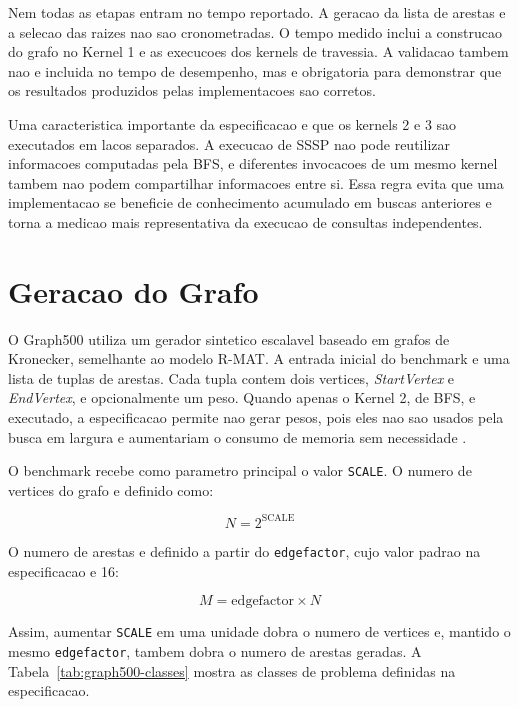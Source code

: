 Nem todas as etapas entram no tempo reportado. A geracao da lista de arestas e a
selecao das raizes nao sao cronometradas. O tempo medido inclui a construcao do
grafo no Kernel 1 e as execucoes dos kernels de travessia. A validacao tambem nao
e incluida no tempo de desempenho, mas e obrigatoria para demonstrar que os
resultados produzidos pelas implementacoes sao corretos.

Uma caracteristica importante da especificacao e que os kernels 2 e 3 sao
executados em lacos separados. A execucao de SSSP nao pode reutilizar informacoes
computadas pela BFS, e diferentes invocacoes de um mesmo kernel tambem nao podem
compartilhar informacoes entre si. Essa regra evita que uma implementacao se
beneficie de conhecimento acumulado em buscas anteriores e torna a medicao mais
representativa da execucao de consultas independentes.

\section{Geracao do Grafo}

O Graph500 utiliza um gerador sintetico escalavel baseado em grafos de Kronecker,
semelhante ao modelo R-MAT. A entrada inicial do benchmark e uma lista de tuplas
de arestas. Cada tupla contem dois vertices, \textit{StartVertex} e
\textit{EndVertex}, e opcionalmente um peso. Quando apenas o Kernel 2, de BFS, e
executado, a especificacao permite nao gerar pesos, pois eles nao sao usados pela
busca em largura e aumentariam o consumo de memoria sem necessidade
\cite{graph500spec}.

O benchmark recebe como parametro principal o valor \texttt{SCALE}. O numero de
vertices do grafo e definido como:

\begin{equation}
N = 2^{\mathrm{SCALE}}
\end{equation}

O numero de arestas e definido a partir do \texttt{edgefactor}, cujo valor padrao
na especificacao e 16:

\begin{equation}
M = \mathrm{edgefactor} \times N
\end{equation}

Assim, aumentar \texttt{SCALE} em uma unidade dobra o numero de vertices e,
mantido o mesmo \texttt{edgefactor}, tambem dobra o numero de arestas geradas. A
Tabela~\ref{tab:graph500-classes} mostra as classes de problema definidas na
especificacao.

